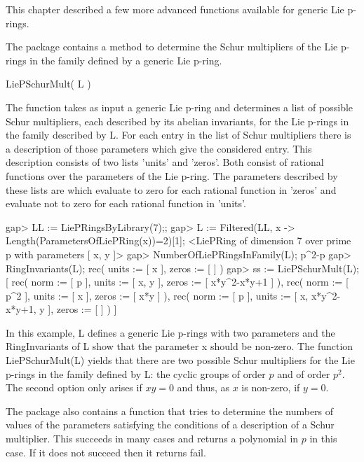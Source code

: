 

This chapter described a few more advanced functions available for 
generic Lie p-rings. 


The package contains a method to determine the Schur multipliers of the
Lie p-rings in the family defined by a generic Lie p-ring. 

\> LiePSchurMult( L )

The function takes as input a generic Lie p-ring and determines a list 
of possible Schur multipliers, each described by its abelian invariants, 
for the Lie p-rings in the family described by L. For each entry in the 
list of Schur multipliers there is a description of those parameters which 
give the considered entry. This description consists of two lists 
'units' and 'zeros'. Both consist of rational functions over the parameters 
of the Lie p-ring. The parameters described by these lists are which evaluate
to zero for each rational function in 'zeros' and evaluate not to zero
for each rational function in 'units'.

\beginexample
gap> LL := LiePRingsByLibrary(7);;
gap> L := Filtered(LL, x -> Length(ParametersOfLiePRing(x))=2)[1]; 
<LiePRing of dimension 7 over prime p with parameters [ x, y ]>
gap> NumberOfLiePRingsInFamily(L);
p^2-p
gap> RingInvariants(L);
rec( units := [ x ], zeros := [  ] )
gap> ss := LiePSchurMult(L);
[ rec( norm := [ p ], units := [ x, y ], zeros := [ x*y^2-x*y+1 ] ), 
  rec( norm := [ p^2 ], units := [ x ], zeros := [ x*y ] ), 
  rec( norm := [ p ], units := [ x, x*y^2-x*y+1, y ], zeros := [  ] ) ]
\endexample

In this example, L defines a generic Lie p-rings with two parameters and
the RingInvariants of L show that the parameter x should be non-zero. The
function LiePSchurMult(L) yields that there are two possible Schur 
multipliers for the Lie p-rings in the family defined by L: the cyclic
groups of order $p$ and of order $p^2$. The second option only arises 
if $xy = 0$ and thus, as $x$ is non-zero, if $y = 0$.

The package also contains a function that tries to determine the numbers of 
values of the parameters satisfying the conditions of a description of
a Schur multiplier. This succeeds in many cases and returns a polynomial
in $p$ in this case. If it does not succeed then it returns fail.

